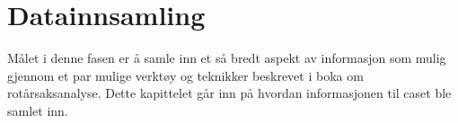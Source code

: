 \chapter{Datainnsamling}
Målet i denne fasen er å samle inn et så bredt aspekt av informasjon som mulig gjennom et par mulige verktøy og teknikker beskrevet i boka om rotårsaksanalyse\cite{RCA}. Dette kapittelet går inn på hvordan informasjonen til caset ble samlet inn.